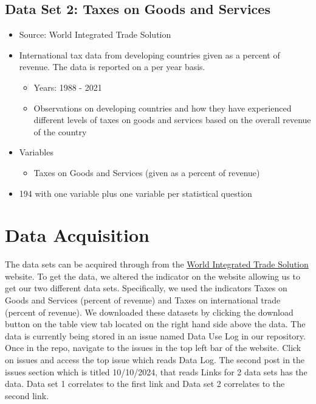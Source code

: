\documentclass[12pt]{article}
\begin{document}
\subsection{Data Set 2: Taxes on Goods and Services}

\begin{itemize}
  \item Source: World Integrated Trade Solution
  \item International tax data from developing countries given as a percent of revenue. The data is reported on a per year basis. 
    \begin{itemize}
        \item Years: 1988 - 2021
        \item Observations on developing countries and how they have experienced different levels of taxes on goods and services based on the overall revenue of the country
    \end{itemize}
  \item Variables
    \begin{itemize}
        \item Taxes on Goods and Services (given as a percent of revenue)
    \end{itemize}
  \item 194 with one variable plus one variable per statistical question
\end{itemize}

\noindent

\section{Data Acquisition}
\label{sec:theory}

The data sets can be acquired through from the 
 \href{https://wits.worldbank.org/CountryProfile/en/Country/BY-COUNTRY/StartYear/1988/EndYear/2022/Indicator/GC-TAX-GSRV-VA-ZS}{World Integrated Trade Solution}  website. To get the data, we altered the indicator on the website allowing us to get our two different data sets. Specifically, we used the indicators Taxes on Goods and Services (percent of revenue) and Taxes on international trade (percent of revenue). We downloaded these datasets by clicking the download button on the table view tab located on the right hand side above the data. The data is currently being stored in an issue named Data Use Log in our repository. Once in the repo, navigate to the issues in the top left bar of the website. Click on issues and access the top issue which reads Data Log. The second post in the issues section which is titled 10/10/2024, that reads Links for 2 data sets has the data. Data set 1 correlates to the first link and Data set 2 correlates to the second link.
\end{document}

